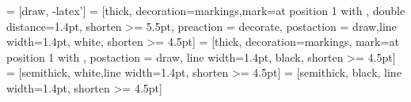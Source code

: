  = [draw, -latex']
 = [thick, decoration={markings,mark=at position
   1 with {}},
   double distance=1.4pt, shorten >= 5.5pt,
   preaction = {decorate},
   postaction = {draw,line width=1.4pt, white, shorten >= 4.5pt}]
 = [thick, decoration={markings, mark=at position
   1 with {}},
   postaction = {draw, line width=1.4pt, black, shorten >= 4.5pt}]
 = [semithick, white,line width=1.4pt, shorten >= 4.5pt]
 = [semithick, black, line width=1.4pt, shorten >= 4.5pt]


\newtheorem{example}{Example}
\newtheorem{theorem}{Theorem}[section]
\newtheorem{lemma}{Lemma}[section]
\newtheorem{axiom}{Axiom}%
\newcommand\tavan{\mathbin{\char`\^}}
 \newcommand{\longtwopartdef}[4]
 {
 	\left\{
 		\begin{array}{ll}
 			\parbox{8cm}{$#1:$} &  #2 \\
 			\parbox{8cm}{$#3:$} &  #4
 		\end{array}
 	\right.
 }
\newcommand{\blankline}{\vspace{\baselineskip}}
\newcommand{\halflineup}{\vspace{-0.5\baselineskip}}
\newcommand{\qqquad}{\qquad\quad}
\newcommand{\mesallossyfif}{\begin{tikzpicture}{every node}
 \node[point,label=left:$a$] (A) {};
           	   \node[point,right of=A,label=below:$b_1\ \ \ $, node distance=1cm] (B1) {};
           	   \node[point,right of=B1,label=below:$\ \ \ b_2$, node distance=0cm] (B2) {};
           	   \node[point,right of=B2,label=right:$c$, node distance=1.5cm] (C) {};
           	   \draw[lossysync] (A) to (B1);
           	   \draw[fifo] (B2) -- (C);
\end{tikzpicture}
}
